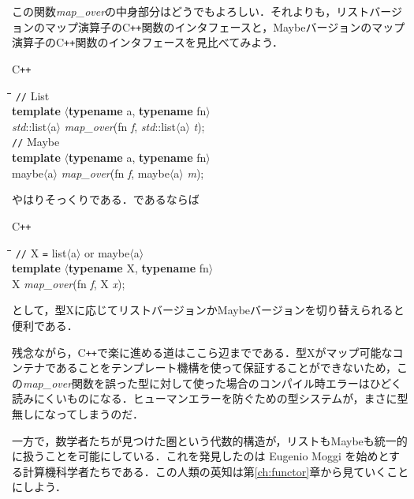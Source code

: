 \documentclass[twocolumn]{jsbook}
\newcommand{\programminglanguage}[1]{\textsf{#1}}
\newcommand{\cxx}{\programminglanguage{C}\texttt{++}}
\newenvironment{cxxcode}{\begin{itembox}[r]{\cxx}}{\end{itembox}}
\newenvironment{pythontab}{\begin{tabbing}\hspace*{1em}\=\hspace*{1em}\=\hspace*{1em}\=\hspace*{1em}\=\kill}{\end{tabbing}}
\newcommand{\pthnClassname}[1]{\textrm{#1}}
\newcommand{\pthnId}[1]{\textit{#1}}
\newcommand{\pthnKeyword}[1]{\textbf{#1}}
\newcommand{\pthnOp}[1]{\texttt{#1}}
\begin{document}
この関数\pthnId{map\_over}の中身部分はどうでもよろしい．それよりも，リストバージョンのマップ演算子の\cxx 関数のインタフェースと，Maybeバージョンのマップ演算子の\cxx 関数のインタフェースを見比べてみよう．
\begin{cxxcode}
\begin{pythontab}
\verb|//| List\\
\pthnKeyword{template} $\langle$\pthnKeyword{typename} \pthnClassname{a}, \pthnKeyword{typename} \pthnClassname{fn}$\rangle$\\
\pthnId{std}::\pthnClassname{list}$\langle$\pthnClassname{a}$\rangle$ \pthnId{map\_over}(\pthnClassname{fn} \pthnId{f}, \pthnId{std}::\pthnClassname{list}$\langle$\pthnClassname{a}$\rangle$ \pthnId{t});\\
\verb|//| Maybe\\
\pthnKeyword{template} $\langle$\pthnKeyword{typename} \pthnClassname{a}, \pthnKeyword{typename} \pthnClassname{fn}$\rangle$\\
\pthnClassname{maybe}$\langle$\pthnClassname{a}$\rangle$ \pthnId{map\_over}(\pthnClassname{fn} \pthnId{f}, \pthnClassname{maybe}$\langle$\pthnClassname{a}$\rangle$ \pthnId{m});
\end{pythontab}
\end{cxxcode}
やはりそっくりである．であるならば
\begin{cxxcode}
\begin{pythontab}
\verb|//| \pthnClassname{X} \pthnOp{=} \pthnClassname{list}$\langle$\pthnClassname{a}$\rangle$ or \pthnClassname{maybe}$\langle$\pthnClassname{a}$\rangle$ \\
\pthnKeyword{template} $\langle$\pthnKeyword{typename} \pthnClassname{X}, \pthnKeyword{typename} \pthnClassname{fn}$\rangle$\\
\pthnClassname{X} \pthnId{map\_over}(\pthnClassname{fn} \pthnId{f}, \pthnClassname{X} \pthnId{x});
\end{pythontab}
\end{cxxcode}
として，型\pthnClassname{X}に応じてリストバージョンかMaybeバージョンを切り替えられると便利である．

残念ながら，\cxx で楽に進める道はここら辺までである．型\pthnClassname{X}がマップ可能なコンテナであることをテンプレート機構を使って保証することができないため，この\pthnId{map\_over}関数を誤った型に対して使った場合のコンパイル時エラーはひどく読みにくいものになる．ヒューマンエラーを防ぐための型システムが，まさに型無しになってしまうのだ．

一方で，数学者たちが見つけた圏という代数的構造が，リストもMaybeも統一的に扱うことを可能にしている．これを発見したのは Eugenio Moggi を始めとする計算機科学者たちである．この人類の英知は第\ref{ch:functor}章から見ていくことにしよう．
\end{document}
